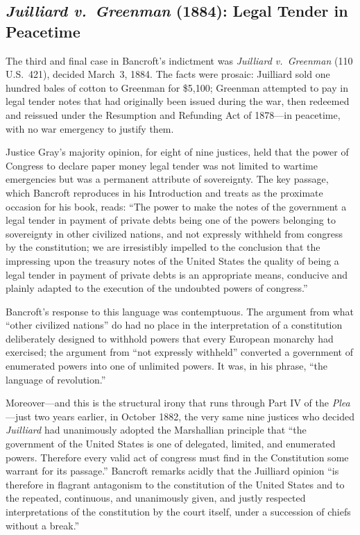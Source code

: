\documentclass[12pt]{article}
\begin{document}
\subsection{\textit{Juilliard v.\ Greenman} (1884): Legal Tender in
Peacetime}

The third and final case in Bancroft's indictment was \textit{Juilliard
v.\ Greenman} (110 U.S.\ 421), decided March~3, 1884. The facts were
prosaic: Juilliard sold one hundred bales of cotton to Greenman for
\$5,100; Greenman attempted to pay in legal tender notes that had
originally been issued during the war, then redeemed and reissued under
the Resumption and Refunding Act of 1878---in peacetime, with no war
emergency to justify them.

Justice Gray's majority opinion, for eight of nine justices, held that
the power of Congress to declare paper money legal tender was not limited
to wartime emergencies but was a permanent attribute of sovereignty. The
key passage, which Bancroft reproduces in his Introduction and treats as
the proximate occasion for his book, reads: ``The power to make the
notes of the government a legal tender in payment of private debts being
one of the powers belonging to sovereignty in other civilized nations,
and not expressly withheld from congress by the constitution; we are
irresistibly impelled to the conclusion that the impressing upon the
treasury notes of the United States the quality of being a legal tender
in payment of private debts is an appropriate means, conducive and plainly
adapted to the execution of the undoubted powers of congress.''

Bancroft's response to this language was contemptuous. The argument from
what ``other civilized nations'' do had no place in the interpretation of
a constitution deliberately designed to withhold powers that every
European monarchy had exercised; the argument from ``not expressly
withheld'' converted a government of enumerated powers into one of
unlimited powers. It was, in his phrase, ``the language of revolution.''

Moreover---and this is the structural irony that runs through Part IV of
the \textit{Plea}---just two years earlier, in October 1882, the very
same nine justices who decided \textit{Juilliard} had unanimously
adopted the Marshallian principle that ``the government of the United
States is one of delegated, limited, and enumerated powers. Therefore
every valid act of congress must find in the Constitution some warrant
for its passage.'' Bancroft remarks acidly that the Juilliard opinion
``is therefore in flagrant antagonism to the constitution of the United
States and to the repeated, continuous, and unanimously given, and
justly respected interpretations of the constitution by the court itself,
under a succession of chiefs without a break.''
\end{document}
